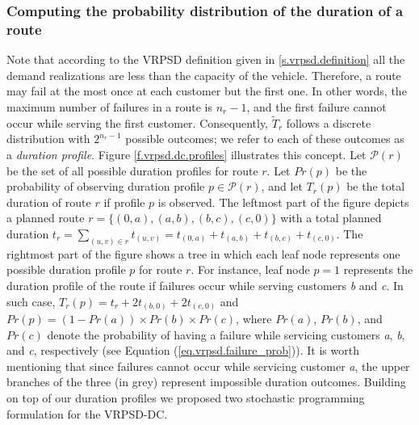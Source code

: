 \subsubsection{Computing the probability distribution of the duration of a route}
Note that according to the VRPSD definition given in \ref{s.vrpsd.definition} all the demand realizations are less than the capacity of the vehicle. Therefore, a route may fail at the most once at each customer but the first one. In other words, the maximum number of failures in a route is $n_{r}-1$, and the first failure cannot occur while serving the first customer. Consequently, $\tilde{T}_{r}$ follows a discrete distribution with $2^{n_r-1}$ possible outcomes; we refer to each of these outcomes as a \emph{duration profile}. Figure \ref{f.vrpsd.dc.profiles} illustrates this concept. Let $\mathcal{P}(r)$ be the set of all possible duration profiles for route $r$. Let $Pr(p)$ be the probability of observing duration profile $p\in\mathcal{P}(r)$, and let $T_{r}(p)$ be the total duration of route $r$ if profile $p$ is observed. The leftmost part of the figure depicts a planned route $r=\{(0,a),(a,b),(b,c),(c,0)\}$ with a total planned duration $t_{r}=\sum_{(u,v)\in r}t_{(u,v)}=t_{(0,a)}+t_{(a,b)}+t_{(b,c)}+t_{(c,0)}$. The rightmost part of the figure shows a tree in which each leaf node represents one possible duration profile $p$ for route $r$. For instance, leaf node $p=1$ represents the duration profile of the route if failures occur while serving customers \emph{b} and \emph{c}. In such case, $T_r(p)=t_r+2t_{(b,0)}+2t_{(c,0)}$ and $Pr(p)=\left(1-Pr(a)\right)\times Pr(b) \times Pr(c)$, where $Pr(a)$, $Pr(b)$, and $Pr(c)$ denote the probability of having a failure while servicing customers \emph{a}, \emph{b}, and \emph{c}, respectively (see Equation (\ref{eq.vrpsd.failure_prob})). It is worth mentioning that since failures cannot occur while servicing customer \emph{a}, the upper branches of the three (in grey) represent impossible duration outcomes. Building on top of our duration profiles we proposed two stochastic programming formulation for the VRPSD-DC.

